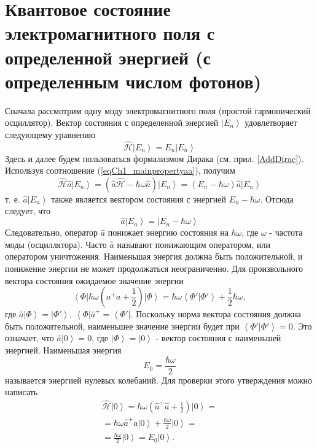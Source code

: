 \section{Квантовое состояние электромагнитного поля с определенной
  энергией (с определенным числом фотонов)}
Сначала рассмотрим одну моду электромагнитного поля (простой
гармонический осциллятор). Вектор состояния с определенной энергией
$\left|E_n\right>$ удовлетворяет следующему уравнению
\begin{equation}
\hat{\mathcal{H}} \left|E_n\right> = E_n \left|E_n\right>
\end{equation}
Здесь и далее будем пользоваться формализмом Дирака (см. прил.
\ref{AddDirac}). Используя соотношение (\ref{eqCh1_mainpropertyaa}),
получим 
\begin{equation}
\hat{\mathcal{H}} \hat{a}\left|E_n\right> = 
\left(\hat{a}\hat{\mathcal{H}} -
\hbar\omega\hat{a}\right)\left|E_n\right> =
\left(E_n - \hbar \omega\right)\hat{a}\left|E_n\right>
\end{equation}
т. е. $\hat{a}\left|E_n\right>$ также является вектором состояния с
энергией $E_n - \hbar \omega$.  Отсюда следует, что
\[
\hat{a}\left|E_n\right> = \left|E_n - \hbar \omega \right>
\] 
Следовательно, оператор $\hat{a}$ понижает энергию состояния на $\hbar
\omega$,  где $\omega$ - частота моды (осциллятора). Часто $\hat{a}$
называют понижающим оператором, или оператором уничтожения. Наименьшая
энергия должна быть положительной, и понижение энергии не может
продолжаться неограниченно. Для произвольного вектора состояния
ожидаемое значение энергии 
\begin{equation}
\left< \Phi \right| \hbar \omega \left({a}^{+} {a}  +
\frac{1}{2}\right)\left| \Phi \right> = 
\hbar \omega \left< \Phi' \right. \left| \Phi' \right> + \frac{1}{2}
\hbar \omega,
\end{equation}
где  $\hat{a} \left| \Phi \right> = \left| \Phi' \right>$,  
$\left< \Phi \right| \hat{a}^{+}  = \left< \Phi' \right|$.  Поскольку
норма вектора состояния должна быть положительной, 
наименьшее значение энергии будет при  
\(
\left< \Phi' \right. \left| \Phi' \right> = 0.
\)
Это означает, что $\hat{a}\left|0\right> = 0$,  где
$\left|\Phi\right> = \left|0\right>$ -  вектор состояния с наименьшей
энергией. Наименьшая энергия  
\begin{equation}
E_0 = \frac{\hbar \omega}{2}
\end{equation}
называется энергией нулевых колебаний. Для проверки этого утверждения
можно написать
\begin{eqnarray}
\hat{\mathcal{H}} \left|0\right> = 
\hbar \omega \left(\hat{a}^{+} \hat{a} +
\frac{1}{2}\right) \left|0\right> = 
\nonumber \\
= 
\hbar \omega \hat{a}^{+} \hat{a} \left|0\right> +
\frac{\hbar \omega}{2}\left|0\right> =
\nonumber \\
= \frac{\hbar \omega}{2} \left|0\right> = 
E_0 \left|0\right>.
\label{eqProper0state}
\end{eqnarray}


